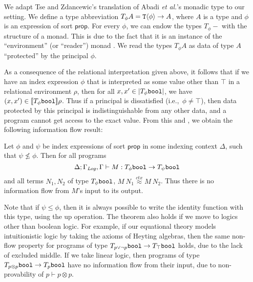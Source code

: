 We adapt Tse and Zdancewic's translation of Abadi \emph{et al.}'s monadic
type to our setting. We define a type abbreviation $T_\phi A =
\textup{\texttt{T}}\langle \phi \rangle \to A$, where $A$ is a type and $\phi$ is an
expression of sort $\mathsf{prop}$. For every $\phi$, we can endow the
types $T_\phi-$ with the structure of a monad. This is due to the fact
that it is an instance of the ``environment'' (or ``reader'') monad
\cite{jones95functional}. We read the types $T_\phi A$ as data of type
$A$ ``protected'' by the principal $\phi$.

As a consequence of the relational interpretation given above, it
follows that if we have an index expression $\phi$ that is interpreted
as some value other than $\top$ in a relational environment $\rho$,
then for all $x,x' \in \left| T_\phi\textup{\texttt{bool}}\right|$, we have $(x,x')
\in \llbracket T_\phi\textup{\texttt{bool}} \rrbracket{\rho}$. Thus if a principal is
dissatisfied (i.e.,~$\phi \not= \top$), then data protected by this
principal is indistinguishable from any other data, and a program
cannot get access to the exact value. From this and
, we obtain the following information flow
result:

\begin{theorem}
  Let $\phi$ and $\psi$ be index expressions of sort $\mathsf{prop}$
  in some indexing context $\Delta$, such that $\psi \not\leq
  \phi$. Then for all programs
  \begin{displaymath}
    \Delta; \Gamma_{\mathit{Log}},\Gamma \vdash M : T_\phi\textup{\texttt{bool}} \to T_\psi\textup{\texttt{bool}}
  \end{displaymath}
  and all terms $N_1,N_2$ of type $T_\phi\textup{\texttt{bool}}$, $M\ N_1
  \stackrel{ctx}\approx M\ N_2$.  Thus there is no information flow
  from $M$'s input to its output.
\end{theorem}
Note that if $\psi \leq \phi$, then it is always possible to write the
identity function with this type, using the $\mathrm{up}$ operation.
The theorem also holds if we move to logics other than boolean
logic. For example, if our equational theory models intuitionistic
logic by taking the axioms of Heyting algebras, then the same non-flow
property for programs of type $T_{p\lor\lnot p}\textup{\texttt{bool}} \to
T_\top\textup{\texttt{bool}}$ holds, due to the lack of excluded middle. If
we take linear logic, then programs of type $T_{p\otimes
  p}\textup{\texttt{bool}} \to T_p\textup{\texttt{bool}}$ have no information flow
from their input, due to non-provability of $p \vdash p \otimes p$.



